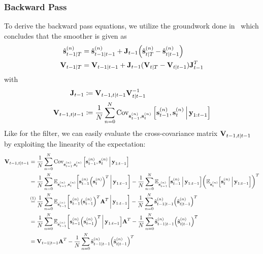 	\subsubsection{Backward Pass}
		To derive the backward pass equations, we utilize the groundwork done in~\cite{deisenrothProbabilisticPerspectiveGaussian2011} which concludes that the smoother is given as
		\begin{align*}
			\hat{\boldsymbol{\mathrm{s}}}_{t - 1 \vert T}^{(n)} & = \hat{\boldsymbol{\mathrm{s}}}_{t - 1 \vert t - 1}^{(n)} + \boldsymbol{\mathrm{J}}_{t - 1} \Big(\hat{\boldsymbol{\mathrm{s}}}_{t \vert T}^{(n)} - \hat{\boldsymbol{\mathrm{s}}}_{t \vert t - 1}^{(n)}\Big) \\
			\boldsymbol{\mathrm{V}}_{t - 1 \vert T}             & = \boldsymbol{\mathrm{V}}_{t - 1 \vert t - 1} + \boldsymbol{\mathrm{J}}_{t - 1} (\boldsymbol{\mathrm{V}}_{t \vert T} - \boldsymbol{\mathrm{V}}_{t \vert t - 1}) \boldsymbol{\mathrm{J}}_{t - 1}^T
		\end{align*}
		with
		\begin{align}
			\boldsymbol{\mathrm{J}}_{t - 1}                    &\coloneqq \boldsymbol{\mathrm{V}}_{t - 1, t \vert t - 1} \boldsymbol{\mathrm{V}}_{t \vert t - 1}^{-1}  \nonumber \\
			\boldsymbol{\mathrm{V}}_{t - 1, t \vert t - 1} &\coloneqq \frac{1}{N} \sum_{n = 0}^{N} \operatorname{Cov}_{\boldsymbol{\mathrm{s}}_{t - 1}^{(n)}, \boldsymbol{\mathrm{s}}_t^{(n)}}\Big[\boldsymbol{\mathrm{s}}_{t - 1}^{(n)}, \boldsymbol{\mathrm{s}}_t^{(n)} \,\Big\vert\, \boldsymbol{\mathrm{y}}_{1:t - 1}\Big]  \label{eq:smootherPriorCrossCov}
		\end{align}
		Like for the filter, we can easily evaluate the cross-covariance matrix \( \boldsymbol{\mathrm{V}}_{t - 1, t \vert t - 1} \) by exploiting the linearity of the expectation:
		\begin{align*}
			\mat{V}_{t - 1, t \subgiven t - 1}
				&= \frac{1}{N} \sum_{n = 0}^{N} \Cov_{\vec{s}_{t - 1}^{(n)}, \vec{s}_t^{(n)}}\Big[\vec{s}_{t - 1}^{(n)}, \vec{s}_t^{(n)} \Biggiven \vec{y}_{1:t - 1}\Big] \\
				&= \frac{1}{N} \sum_{n = 0}^{N} \E_{\vec{s}_{t - 1}^{(n)}, \vec{s}_t^{(n)}}\bigg[\vec{s}_{t - 1}^{(n)} \Big(\vec{s}_t^{(n)}\Big)^T \bigggiven \vec{y}_{1:t - 1}\bigg] - \frac{1}{N} \sum_{n = 0}^{N} \E_{\vec{s}_{t - 1}^{(n)}}\Big[\vec{s}_{t - 1}^{(n)} \Biggiven \vec{y}_{1:t - 1}\Big] \bigg( \E_{\vec{s}_t^{(n)}}\Big[\vec{s}_t^{(n)} \Biggiven \vec{y}_{1:t - 1}\Big] \bigg)^T \\
				&\oversetfootnotemark{=} \frac{1}{N} \sum_{n = 0}^{N} \E_{\vec{s}_{t - 1}^{(n)}}\bigg[\vec{s}_{t - 1}^{(n)} \big(\vec{s}_{t - 1}^{(n)}\Big)^T \mat{A}^T \bigggiven \vec{y}_{1:t - 1}\bigg] - \frac{1}{N} \sum_{n = 0}^{N} \hat{\vec{s}}_{t - 1 \subgiven t - 1}^{(n)} \Big(\hat{\vec{s}}_{t \subgiven t - 1}^{(n)}\Big)^T \\
				&= \frac{1}{N} \sum_{n = 0}^{N} \E_{\vec{s}_{t - 1}^{(n)}}\bigg[\vec{s}_{t - 1}^{(n)} \Big(\vec{s}_{t - 1}^{(n)}\Big)^T \bigggiven \vec{y}_{1:t - 1}\Big] \mat{A}^T - \frac{1}{N} \sum_{n = 0}^{N} \hat{\vec{s}}_{t - 1 \subgiven t - 1}^{(n)} \Big(\hat{\vec{s}}_{t \subgiven t - 1}^{(n)}\Big)^T \\
				&= \mat{V}_{t - 1 \subgiven t - 1} \mat{A}^T - \frac{1}{N} \sum_{n = 0}^{N} \hat{\vec{s}}_{t - 1 \subgiven t - 1}^{(n)} \Big(\hat{\vec{s}}_{t \subgiven t - 1}^{(n)}\Big)^T
		\end{align*}
